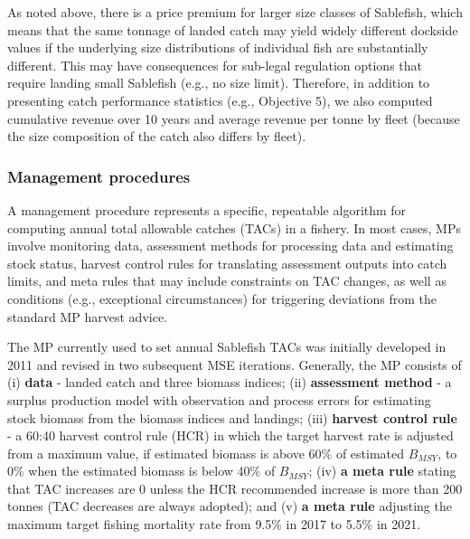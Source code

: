 \documentclass[11pt]{book}
\begin{document}
As noted above, there is a price premium for larger size classes of Sablefish, which means that the same tonnage of landed catch may yield widely different dockside values if the underlying size distributions of individual fish are substantially different. This may have consequences for sub-legal regulation options that require landing small Sablefish (e.g., no size limit). Therefore, in addition to presenting catch performance statistics (e.g., Objective 5), we also computed cumulative revenue over 10 years and average revenue per tonne by fleet (because the size composition of the catch also differs by fleet).

\hypertarget{management-procedures}{%
\subsubsection{Management procedures}\label{management-procedures}}

A management procedure represents a specific, repeatable algorithm for computing annual total allowable catches (TACs) in a fishery. In most cases, MPs involve monitoring data, assessment methods for processing data and estimating stock status, harvest control rules for translating assessment outputs into catch limits, and meta rules that may include constraints on TAC changes, as well as conditions (e.g., exceptional circumstances) for triggering deviations from the standard MP harvest advice.

The MP currently used to set annual Sablefish TACs was initially developed in 2011 and revised in two subsequent MSE iterations. Generally, the MP consists of (i) \textbf{data} - landed catch and three biomass indices; (ii) \textbf{assessment method} - a surplus production model with observation and process errors for estimating stock biomass from the biomass indices and landings; (iii) \textbf{harvest control rule} - a 60:40 harvest control rule (HCR) in which the target harvest rate is adjusted from a maximum value, if estimated biomass is above 60\% of estimated \(B_{MSY}\), to 0\% when the estimated biomass is below 40\% of \(B_{MSY}\); (iv) \textbf{a meta rule} stating that TAC increases are 0 unless the HCR recommended increase is more than 200 tonnes (TAC decreases are always adopted); and (v) \textbf{a meta rule} adjusting the maximum target fishing mortality rate from 9.5\% in 2017 to 5.5\% in 2021.
\end{document}
